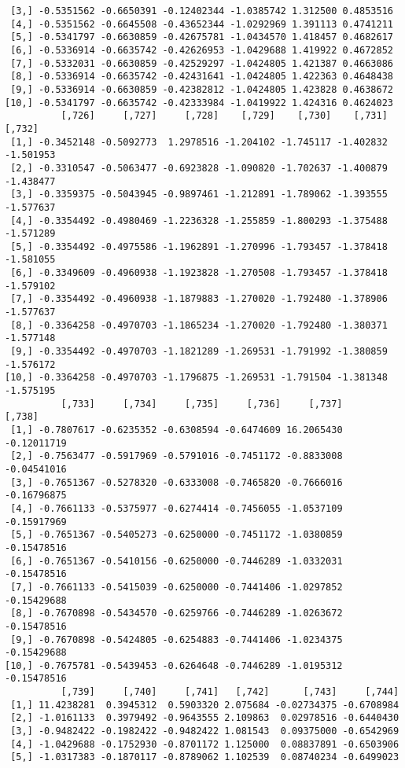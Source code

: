 \documentclass[
  letterpaper,
  DIV=11,
  numbers=noendperiod]{scrreprt}
\begin{document}
\begin{verbatim}
 [3,] -0.5351562 -0.6650391 -0.12402344 -1.0385742 1.312500 0.4853516
 [4,] -0.5351562 -0.6645508 -0.43652344 -1.0292969 1.391113 0.4741211
 [5,] -0.5341797 -0.6630859 -0.42675781 -1.0434570 1.418457 0.4682617
 [6,] -0.5336914 -0.6635742 -0.42626953 -1.0429688 1.419922 0.4672852
 [7,] -0.5332031 -0.6630859 -0.42529297 -1.0424805 1.421387 0.4663086
 [8,] -0.5336914 -0.6635742 -0.42431641 -1.0424805 1.422363 0.4648438
 [9,] -0.5336914 -0.6630859 -0.42382812 -1.0424805 1.423828 0.4638672
[10,] -0.5341797 -0.6635742 -0.42333984 -1.0419922 1.424316 0.4624023
          [,726]     [,727]     [,728]    [,729]    [,730]    [,731]    [,732]
 [1,] -0.3452148 -0.5092773  1.2978516 -1.204102 -1.745117 -1.402832 -1.501953
 [2,] -0.3310547 -0.5063477 -0.6923828 -1.090820 -1.702637 -1.400879 -1.438477
 [3,] -0.3359375 -0.5043945 -0.9897461 -1.212891 -1.789062 -1.393555 -1.577637
 [4,] -0.3354492 -0.4980469 -1.2236328 -1.255859 -1.800293 -1.375488 -1.571289
 [5,] -0.3354492 -0.4975586 -1.1962891 -1.270996 -1.793457 -1.378418 -1.581055
 [6,] -0.3349609 -0.4960938 -1.1923828 -1.270508 -1.793457 -1.378418 -1.579102
 [7,] -0.3354492 -0.4960938 -1.1879883 -1.270020 -1.792480 -1.378906 -1.577637
 [8,] -0.3364258 -0.4970703 -1.1865234 -1.270020 -1.792480 -1.380371 -1.577148
 [9,] -0.3354492 -0.4970703 -1.1821289 -1.269531 -1.791992 -1.380859 -1.576172
[10,] -0.3364258 -0.4970703 -1.1796875 -1.269531 -1.791504 -1.381348 -1.575195
          [,733]     [,734]     [,735]     [,736]     [,737]      [,738]
 [1,] -0.7807617 -0.6235352 -0.6308594 -0.6474609 16.2065430 -0.12011719
 [2,] -0.7563477 -0.5917969 -0.5791016 -0.7451172 -0.8833008 -0.04541016
 [3,] -0.7651367 -0.5278320 -0.6333008 -0.7465820 -0.7666016 -0.16796875
 [4,] -0.7661133 -0.5375977 -0.6274414 -0.7456055 -1.0537109 -0.15917969
 [5,] -0.7651367 -0.5405273 -0.6250000 -0.7451172 -1.0380859 -0.15478516
 [6,] -0.7651367 -0.5410156 -0.6250000 -0.7446289 -1.0332031 -0.15478516
 [7,] -0.7661133 -0.5415039 -0.6250000 -0.7441406 -1.0297852 -0.15429688
 [8,] -0.7670898 -0.5434570 -0.6259766 -0.7446289 -1.0263672 -0.15478516
 [9,] -0.7670898 -0.5424805 -0.6254883 -0.7441406 -1.0234375 -0.15429688
[10,] -0.7675781 -0.5439453 -0.6264648 -0.7446289 -1.0195312 -0.15478516
          [,739]     [,740]     [,741]   [,742]      [,743]     [,744]
 [1,] 11.4238281  0.3945312  0.5903320 2.075684 -0.02734375 -0.6708984
 [2,] -1.0161133  0.3979492 -0.9643555 2.109863  0.02978516 -0.6440430
 [3,] -0.9482422 -0.1982422 -0.9482422 1.081543  0.09375000 -0.6542969
 [4,] -1.0429688 -0.1752930 -0.8701172 1.125000  0.08837891 -0.6503906
 [5,] -1.0317383 -0.1870117 -0.8789062 1.102539  0.08740234 -0.6499023

\end{verbatim}
\end{document}
